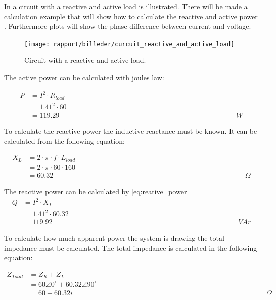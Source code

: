 In  a circuit with a reactive and active load is illustrated. There will be made a calculation example that will show how to calculate the reactive and active power \cite{allaboutcircuits}. Furthermore plots will show the phase difference between current and voltage.
\begin{figure}[H]
\centering
\texttt{[image: rapport/billeder/curcuit\_reactive\_and\_active\_load]}
\caption{Circuit with a reactive and active load.}
\label{fig:circuit_reactive_and_active_load}
\end{figure}  

The active power can be calculated with joules law:

\begin{align}
P &= I^2 \cdot R_{load} \\ \nonumber
  &= 1.41^2 \cdot 60 \\ \nonumber
  &= 119.29 & & & & & & & & & & & & & & & & & & & & & & & & & & & & & & \unit{W}
\end{align}

To calculate the reactive power the inductive reactance must be known. It can be calculated from the following equation:

\begin{align}
X_{L} &= 2 \cdot \pi \cdot f \cdot L_{load} \\ \nonumber
  &= 2 \cdot \pi \cdot 60 \cdot 160 \\ \nonumber
  &= 60.32 & & & & & & & & & & & & & & & & & & & & & & & & & & & & & & \unit{\Omega}
\end{align}

The reactive power can be calculated by \eqref{eq:reative_power}
\begin{align}\label{eq:reative_power}
Q &= I^2 \cdot X_{L} \\ \nonumber
  &= 1.41^2 \cdot 60.32 \\ \nonumber
  &= 119.92 & & & & & & & & & & & & & & & & & & & & & & & & & & & & & & \unit{VAr}
\end{align}

To calculate how much apparent power the system is drawing the total impedance must be calculated. The total impedance is calculated in the following equation:

\begin{align}
Z_{Total} &= Z_R + Z_L \\ \nonumber
  &= 60 \angle 0^{\circ} + 60.32 \angle 90^{\circ} \\ \nonumber
  &= 60 + 60.32i & & & & & & & & & & & & & & & & & & & & & & & & & & & & & & \unit{\Omega}
\end{align}

